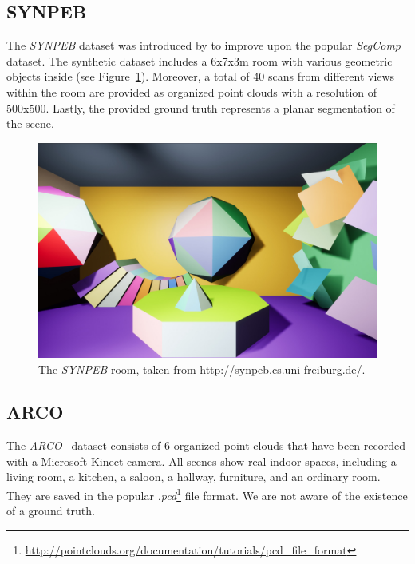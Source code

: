 \documentclass[main.tex]{subfiles}
\begin{document}
\subsection{SYNPEB}
\label{subsec:bg-SYNPEB}
The \textit{SYNPEB} dataset was introduced by \citeauthor{schaefer19icra}\cite{schaefer19icra} to improve upon the popular
\textit{SegComp} dataset. The synthetic dataset includes a 6x7x3m room with various geometric objects inside (see Figure~\ref{fig:SYNPEB}).
Moreover, a total of 40 scans from different views within the room are provided as organized point clouds with
a resolution of 500x500. Lastly, the provided ground truth represents a planar segmentation of the scene.

\begin{figure}[H]
    \centering
    \includegraphics[width=\textwidth]{images/synpeb_room.jpg}
    \caption[SYNPEB]{The \textit{SYNPEB} room, taken from \href{http://synpeb.cs.uni-freiburg.de/}{http://synpeb.cs.uni-freiburg.de/}.}
    \label{fig:SYNPEB}
\end{figure}

\subsection{ARCO}
\label{subsec:bg-ARCO}
The \textit{ARCO}~\cite{Hidalgo-Paniagua_Vega-Rodríguez_Pavón_Ferruz_2015} dataset consists of 6 organized point clouds that have been recorded with a Microsoft Kinect camera.
All scenes show real indoor spaces, including a living room, a kitchen, a saloon, a hallway, furniture, and an ordinary room.
They are saved in the popular \textit{.pcd}\footnote{\href{http://pointclouds.org/documentation/tutorials/pcd\_file\_format}{http://pointclouds.org/documentation/tutorials/pcd\_file\_format}} file format.
We are not aware of the existence of a ground truth.
\end{document}
